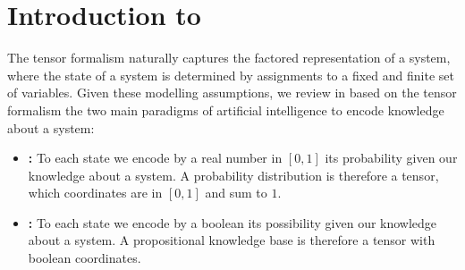 \chapter{Introduction to }

The tensor formalism naturally captures the factored representation of a system, where the state of a system is determined by assignments to a fixed and finite set of variables.
Given these modelling assumptions, we review in  based on the tensor formalism the two main paradigms of artificial intelligence to encode knowledge about a system:
\begin{itemize}
    \item \textbf{\ProbabilityTheory{}:} To each state we encode by a real number in $[0,1]$ its probability given our knowledge about a system.
    A probability distribution is therefore a tensor, which coordinates are in $[0,1]$ and sum to $1$.
    \item \textbf{\PropositionalLogic{}:} To each state we encode by a boolean its possibility given our knowledge about a system.
    A propositional knowledge base is therefore a tensor with boolean coordinates.
\end{itemize}


